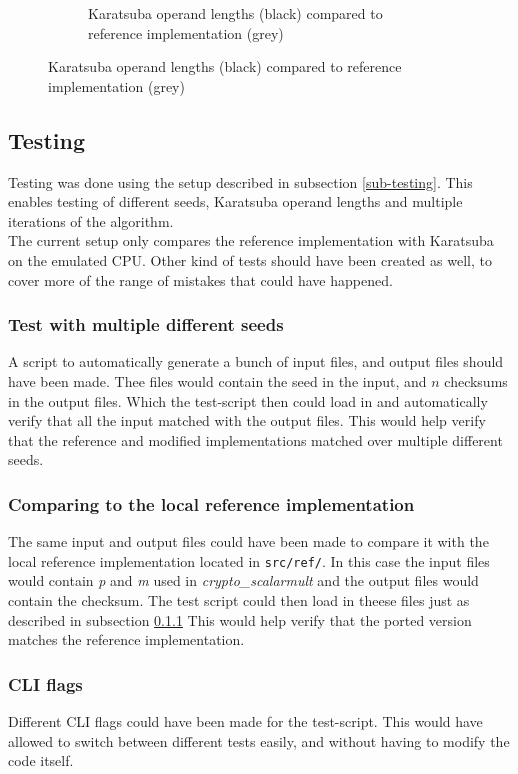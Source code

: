 \begin{figure}[H]
\begin{subfigure}{\textwidth}
    \centering
    \caption{Karatsuba operand lengths (black) compared to reference implementation (grey)}
\end{subfigure}
\label{karatsubacomparison}
\end{figure}


\subsection{Testing}
Testing was done using the setup described in subsection \ref{sub-testing}. This enables testing of different seeds, Karatsuba operand lengths and multiple iterations of the algorithm.
\\
The current setup only compares the reference implementation with Karatsuba on the emulated CPU. Other kind of tests should have been created as well, to cover more of the range of mistakes that could have happened.\\
\subsubsection{Test with multiple different seeds}
\label{missing-test-1}
A script to automatically generate a bunch of input files, and output files should have been made. Thee files would contain the seed in the input, and $n$ checksums in the output files. Which the test-script then could load in and automatically verify that all the input matched with the output files. This would help verify that the reference and modified implementations matched over multiple different seeds.

\subsubsection{Comparing to the local reference implementation}
The same input and output files could have been made to compare it with the local reference implementation located in \texttt{src/ref/}. In this case the input files would contain \textit{p} and \textit{m} used in \textit{crypto\_scalarmult} and the output files would contain the checksum. The test script could then load in theese files just as described in subsection \ref{missing-test-1} This would help verify that the ported version matches the reference implementation.

\subsubsection{CLI flags}
Different CLI flags could have been made for the test-script. This would have allowed to switch between different tests easily, and without having to modify the code itself.